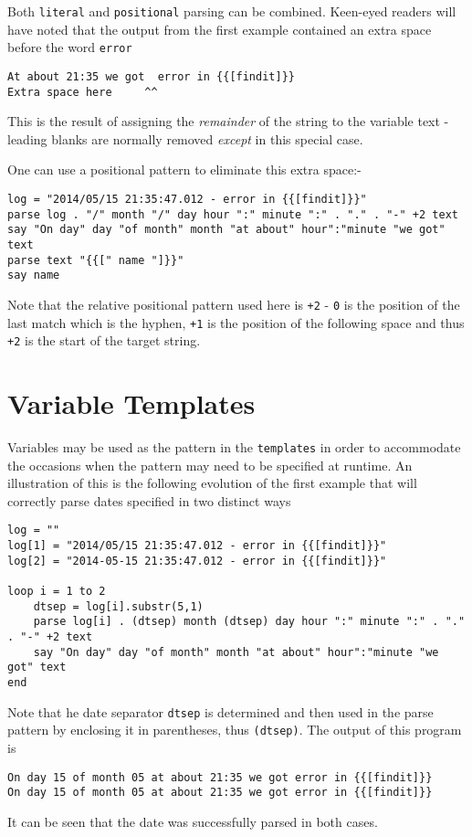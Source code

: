 Both \texttt{literal} and \texttt{positional} parsing can be combined. Keen-eyed readers will have noted that the output from the first example contained an extra space before the word \texttt{error}
\begin{verbatim}
At about 21:35 we got  error in {{[findit]}} 
Extra space here     ^^
\end{verbatim}
This is the result of assigning the \textit{remainder} of the string to the variable text - leading blanks are normally removed \textit{except} in this special case.

One can use a positional pattern to eliminate this extra space:-
\begin{lstlisting}[label=combinedParsing, caption=Combined Parsing]
log = "2014/05/15 21:35:47.012 - error in {{[findit]}}"
parse log . "/" month "/" day hour ":" minute ":" . "." . "-" +2 text
say "On day" day "of month" month "at about" hour":"minute "we got" text
parse text "{{[" name "]}}"
say name
\end{lstlisting}

Note that the relative positional pattern used here is \texttt{+2} - \texttt{0} is the position of the last match which is the hyphen, \texttt{+1} is the position of the following space and thus \texttt{+2} is the start of the target string. 

\section{Variable Templates}
Variables may be used as the pattern in the \texttt{templates} in order to accommodate the occasions when the pattern may need to be specified at runtime. An illustration of this is the following evolution of the first example that will correctly parse dates specified in two distinct ways
\begin{lstlisting}[label=variablePattern, caption=Variables in Patterns]
log = ""
log[1] = "2014/05/15 21:35:47.012 - error in {{[findit]}}"
log[2] = "2014-05-15 21:35:47.012 - error in {{[findit]}}"

loop i = 1 to 2
	dtsep = log[i].substr(5,1)
	parse log[i] . (dtsep) month (dtsep) day hour ":" minute ":" . "." . "-" +2 text
	say "On day" day "of month" month "at about" hour":"minute "we got" text
end
\end{lstlisting}
Note that he date separator \texttt{dtsep} is determined and then used in the parse pattern by enclosing it in parentheses, thus \texttt{(dtsep)}. The output of this program is
\begin{verbatim}
On day 15 of month 05 at about 21:35 we got error in {{[findit]}} 
On day 15 of month 05 at about 21:35 we got error in {{[findit]}} 
\end{verbatim}
It can be seen that the date was successfully parsed in both cases.

